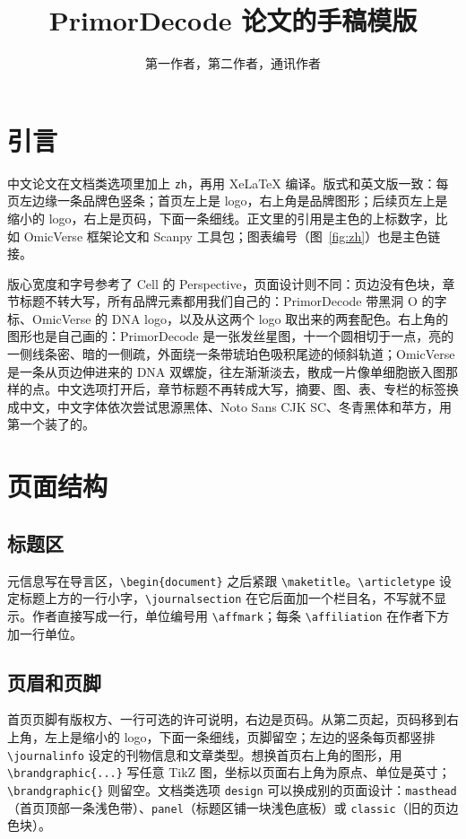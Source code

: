 \documentclass[brand=primordecode, zh]{pdarticle}
\title{PrimorDecode 论文的手稿模版}
\author{第一作者\affmark{1}，第二作者\affmark{1,2}，通讯作者\affmark{2,*}}
\affiliation{1}{[院系，单位，城市，国家]}
\affiliation{2}{[院系，单位，城市，国家]}
\begin{document}
\maketitle

\section{引言}

中文论文在文档类选项里加上 \texttt{zh}，再用 XeLaTeX 编译。版式和英文版一致：每页左边缘一条品牌色竖条；首页左上是 logo，右上角是品牌图形；后续页左上是缩小的 logo，右上是页码，下面一条细线。正文里的引用是主色的上标数字，比如 OmicVerse 框架论文\cite{zeng2024omicverse}和 Scanpy 工具包\cite{wolf2018scanpy}；图表编号（图~\ref{fig:zh}）也是主色链接。

版心宽度和字号参考了 Cell 的 Perspective\cite{guo2026autonomous}，页面设计则不同：页边没有色块，章节标题不转大写，所有品牌元素都用我们自己的：PrimorDecode 带黑洞 O 的字标、OmicVerse 的 DNA logo，以及从这两个 logo 取出来的两套配色。右上角的图形也是自己画的：PrimorDecode 是一张发丝星图，十一个圆相切于一点，亮的一侧线条密、暗的一侧疏，外面绕一条带琥珀色吸积尾迹的倾斜轨道；OmicVerse 是一条从页边伸进来的 DNA 双螺旋，往左渐渐淡去，散成一片像单细胞嵌入图那样的点。中文选项打开后，章节标题不再转成大写，摘要、图、表、专栏的标签换成中文，中文字体依次尝试思源黑体、Noto Sans CJK SC、冬青黑体和苹方，用第一个装了的。

\section{页面结构}

\subsection{标题区}

元信息写在导言区，\texttt{\textbackslash begin\{document\}} 之后紧跟 \texttt{\textbackslash maketitle}。\texttt{\textbackslash articletype} 设定标题上方的一行小字，\texttt{\textbackslash journalsection} 在它后面加一个栏目名，不写就不显示。作者直接写成一行，单位编号用 \texttt{\textbackslash affmark}；每条 \texttt{\textbackslash affiliation} 在作者下方加一行单位。

\subsection{页眉和页脚}

首页页脚有版权方、一行可选的许可说明，右边是页码。从第二页起，页码移到右上角，左上是缩小的 logo，下面一条细线，页脚留空；左边的竖条每页都竖排 \texttt{\textbackslash journalinfo} 设定的刊物信息和文章类型。想换首页右上角的图形，用 \texttt{\textbackslash brandgraphic\{...\}} 写任意 TikZ 图，坐标以页面右上角为原点、单位是英寸；\texttt{\textbackslash brandgraphic\{\}} 则留空。文档类选项 \texttt{design} 可以换成别的页面设计：\texttt{masthead}（首页顶部一条浅色带）、\texttt{panel}（标题区铺一块浅色底板）或 \texttt{classic}（旧的页边色块）。
\end{document}
